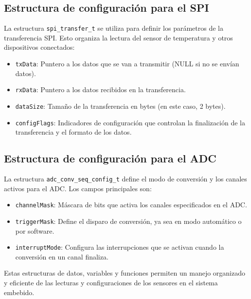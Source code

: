 \subsection{Estructura de configuración para el SPI}

La estructura \texttt{spi\_transfer\_t} se utiliza para definir los parámetros de la transferencia SPI. Esto organiza la lectura del sensor de temperatura y otros dispositivos conectados:

\begin{itemize}
    \item \texttt{txData}: Puntero a los datos que se van a transmitir (NULL si no se envían datos).
    \item \texttt{rxData}: Puntero a los datos recibidos en la transferencia.
    \item \texttt{dataSize}: Tamaño de la transferencia en bytes (en este caso, 2 bytes).
    \item \texttt{configFlags}: Indicadores de configuración que controlan la finalización de la transferencia y el formato de los datos.
\end{itemize}

\subsection{Estructura de configuración para el ADC}

La estructura \texttt{adc\_conv\_seq\_config\_t} define el modo de conversión y los canales activos para el ADC. Los campos principales son:

\begin{itemize}
    \item \texttt{channelMask}: Máscara de bits que activa los canales especificados en el ADC.
    \item \texttt{triggerMask}: Define el disparo de conversión, ya sea en modo automático o por software.
    \item \texttt{interruptMode}: Configura las interrupciones que se activan cuando la conversión en un canal finaliza.
\end{itemize}

Estas estructuras de datos, variables y funciones permiten un manejo organizado y eficiente de las lecturas y configuraciones de los sensores en el sistema embebido.

 

    